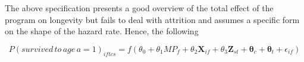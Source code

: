 The above specification presents a good overview of the total effect of the program on longevity but fails to deal with attrition and assumes a specific form on the shape of the hazard rate. Hence, the following 

$$
P(survived\,to\,age\,a=1)_{iftcs} = f(\theta_0 + \theta_1MP_f + \theta_2\mathbf{X}_{if} + \theta_3\mathbf{Z}_{st} + \mathbf{\theta}_c + \mathbf{\theta}_t + \epsilon_{if})
$$